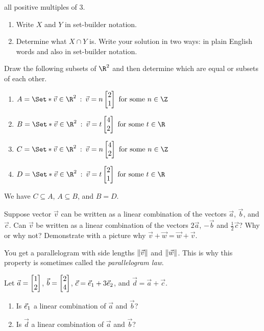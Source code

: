 \begin{exercises}
\begin{problist}
			all positive multiples of $3$.
			\begin{enumerate}
				\item Write $X$ and $Y$ in set-builder notation.
				\item Determine what $X\cap Y$ is. Write your solution in two ways: in
					plain English words and also in set-builder notation.
			\end{enumerate}
		\prob
			Draw the following subsets of $\R^2$ and then determine which are equal or
			subsets of each other.
			\begin{enumerate}
				\item $A=\Set*{\vec v\in\R^2\given \vec v=n\mat{2\\1} \text{ for some }n\in\Z}$
				\item $B=\Set*{\vec v\in\R^2\given \vec v=t\mat{4\\2}\text{ for some }t\in\R}$
				\item $C=\Set*{\vec v\in\R^2\given \vec v=n\mat{4\\2} \text{ for some }n\in\Z}$
				\item $D=\Set*{\vec v\in\R^2\given \vec v=t\mat{2\\1}\text{ for some }t\in\R}$
			\end{enumerate}
			\begin{solution}
				We have $C\subseteq A$, $A\subseteq B$, and $B=D$.
			\end{solution}
		\prob
			Suppose vector $\vec v$ can be written as a linear combination of the
			vectors $\vec a$, $\vec b$, and $\vec c$. Can $\vec v$ be written as a
			linear combination of the vectors $2\vec a$, $-\vec b$ and
			$\frac12\vec c$? Why or why not?
		\prob
			Demonstrate with a picture why $\vec v + \vec w = \vec w + \vec v$.
			\begin{solution}
				You get a parallelogram with side lengths $\lVert\vec v\rVert$ and
				$\lVert\vec w\rVert$. This is why this property is sometimes called the
				\emph{parallelogram law}.
			\end{solution}
		\prob Let $\vec a=\mat{1\\2}$, $\vec b=\mat{2\\4}$, $\vec c={\vec e_1}+3{\vec e_2}$, and $\vec d=\vec a+\vec c$.
		\begin{enumerate}
			\item Is ${\vec e_1}$ a linear combination of $\vec a$ and $\vec b$?
			\item Is $\vec d$ a linear combination of $\vec a$ and $\vec b$?

\end{enumerate}
\end{problist}
\end{exercises}
